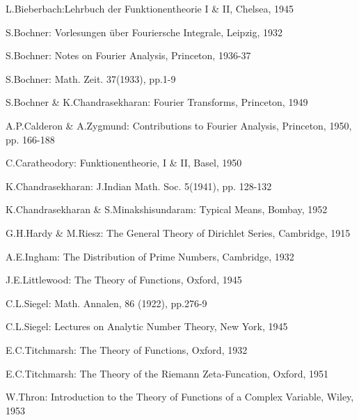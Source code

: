 \begin{thebibliography}{99}
 L.Bieberbach:\pageoriginale Lehrbuch der Funktionentheorie I \& II,
  Chelsea, 1945

 S.Bochner: Vorlesungen \"uber Fouriersche Integrale,
  Leipzig, 1932

 S.Bochner: Notes on Fourier Analysis, Princeton, 1936-37

 S.Bochner: Math. Zeit. 37(1933), pp.1-9

 S.Bochner \& K.Chandrasekharan: Fourier Transforms,
  Princeton, 1949

 A.P.Calderon \& A.Zygmund: Contributions to Fourier
  Analysis, Princeton, 1950, pp. 166-188

 C.Caratheodory: Funktionentheorie, I \& II, Basel, 1950 

 K.Chandrasekharan: J.Indian Math. Soc. 5(1941),
  pp. 128-132 

 K.Chandrasekharan \& S.Minakshisundaram: Typical Means,
  Bombay, 1952

 G.H.Hardy \& M.Riesz: The General Theory of Dirichlet
  Series, Cambridge, 1915

 A.E.Ingham: The Distribution of Prime Numbers,
  Cambridge, 1932

 J.E.Littlewood: The Theory of Functions, Oxford, 1945

 C.L.Siegel: Math. Annalen, 86 (1922), pp.276-9

 C.L.Siegel: Lectures on Analytic Number Theory, New
  York, 1945

 E.C.Titchmarsh: The Theory of Functions, Oxford, 1932

 E.C.Titchmarsh: The Theory of the Riemann
  Zeta-Funcation, Oxford, 1951

 W.Thron: Introduction to   the Theory of Functions of a
  Complex Variable, Wiley, 1953
\end{thebibliography}
